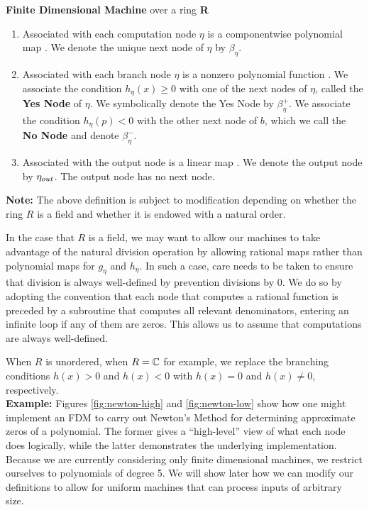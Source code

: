 \begin{definition}{\textbf{Finite Dimensional Machine} over a ring
    \textbf{R}}
\begin{enumerate}
  \item Associated with each computation node $\eta$ is a
    componentwise polynomial map
    . We denote the
    unique next node of $\eta$ by $\beta_\eta$.
    
  \item Associated with each branch node $\eta$ is a nonzero
    polynomial function .  We
    associate the condition $h_\eta(x) \geq 0$ with one of the next
    nodes of $\eta$, called the \textbf{Yes Node} of $\eta$.  We
    symbolically denote the Yes Node by $\beta_\eta^+$. We associate
    the condition $h_\eta(p) < 0$ with the other next node of $b$,
    which we call the \textbf{No Node} and denote $\beta_\eta^-$.
    
  \item Associated with the output node is a linear map
    .  We denote the output
    node by $\eta_{out}$.  The output node has no next node.
  \end{enumerate}
\end{definition}

\textbf{Note: }The above definition is subject to modification
depending on whether the ring $R$ is a field and whether it is endowed
with a natural order.  

In the case that $R$ is a field, we may want to
allow our machines to take advantage of the natural division operation
by allowing rational maps rather than polynomial maps for $g_\eta$ and
$h_\eta$.  In such a case, care needs to be taken to ensure that
division is always well-defined by prevention divisions by $0$.  We do
so by adopting the convention that each node that computes a rational
function is preceded by a subroutine that computes all relevant
denominators, entering an infinite loop if any of them are zeros.
This allows us to assume that computations are always well-defined.

When $R$ is unordered, when $R = \mathbb{C}$ for example, we replace
the branching conditions $h(x) > 0$ and $h(x) < 0$ with $h(x) = 0$ and
$h(x) \neq 0$, respectively.\\

\textbf{Example: } Figures \ref{fig:newton-high} and
\ref{fig:newton-low} show how one might implement an FDM to carry out
Newton's Method for determining approximate zeros of a polynomial.
The former gives a ``high-level'' view of what each node does
logically, while the latter demonstrates the underlying
implementation.  Because we are currently considering only finite
dimensional machines, we restrict ourselves to polynomials of degree
5.  We will show later how we can modify our definitions to allow for
uniform machines that can process inputs of arbitrary size.

